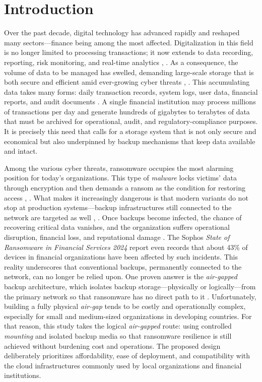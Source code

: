 \documentclass{iaesarticle}
\begin{document}
\section{Introduction}
\label{sec:introduction}
Over the past decade, digital technology has advanced rapidly and reshaped many sectors---finance being among the most affected. Digitalization in this field is no longer limited to processing transactions; it now extends to data recording, reporting, risk monitoring, and real-time analytics \cite{1}, \cite{2}. As a consequence, the volume of data to be managed has swelled, demanding large-scale storage that is both secure and efficient amid ever-growing cyber threats \cite{3}, \cite{4}. This accumulating data takes many forms: daily transaction records, system logs, user data, financial reports, and audit documents \cite{5}. A single financial institution may process millions of transactions per day and generate hundreds of gigabytes to terabytes of data that must be archived for operational, audit, and regulatory-compliance purposes. It is precisely this need that calls for a storage system that is not only secure and economical but also underpinned by backup mechanisms that keep data available and intact.

Among the various cyber threats, ransomware occupies the most alarming position for today's organizations. This type of \textit{malware} locks victims' data through encryption and then demands a ransom as the condition for restoring access \cite{5}, \cite{6}. What makes it increasingly dangerous is that modern variants do not stop at production systems---backup infrastructures still connected to the network are targeted as well \cite{7}, \cite{8}. Once backups become infected, the chance of recovering critical data vanishes, and the organization suffers operational disruption, financial loss, and reputational damage \cite{9}. The Sophos \textit{State of Ransomware in Financial Services 2024} report even records that about 43\% of devices in financial organizations have been affected by such incidents. This reality underscores that conventional backups, permanently connected to the network, can no longer be relied upon. One proven answer is the \textit{air-gapped} backup architecture, which isolates backup storage---physically or logically---from the primary network so that ransomware has no direct path to it \cite{10}. Unfortunately, building a fully physical \textit{air-gap} tends to be costly and operationally complex, especially for small and medium-sized organizations in developing countries. For that reason, this study takes the logical \textit{air-gapped} route: using controlled \textit{mounting} and isolated backup media so that ransomware resilience is still achieved without burdening cost and operations. The proposed design deliberately prioritizes affordability, ease of deployment, and compatibility with the cloud infrastructures commonly used by local organizations and financial institutions.
\end{document}

